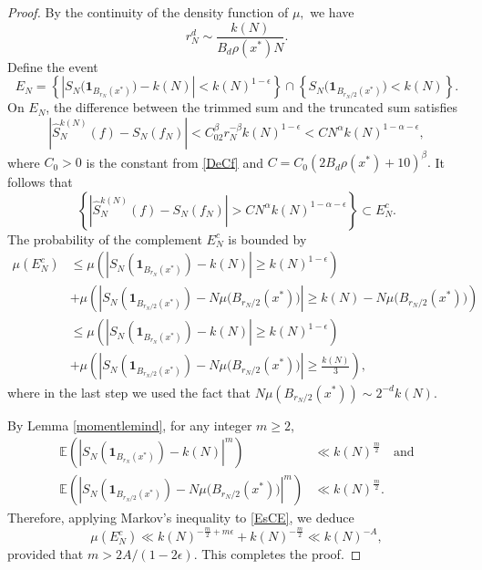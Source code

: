 \documentclass[11pt,twoside,a4paper,reqno]{amsart}
\newcommand{\E}{\mathbb{E}}
\def\one{{\mathbf{1}}}
\begin{document}
\begin{proof}
By the continuity of the density function of $\mu,$ we have
$$r_N^d\sim \frac{k(N)}{B_d \rho(x^*) N}.$$ Define the event
$$
E_N=\left\{\left|S_N\bigl(\one_{B_{r_N}(x^*)}\bigr)-k(N)\right|<k(N)^{1-\epsilon} \right\}\cap\left\{ S_N\bigl(\one_{B_{r_N/2}(x^*)}\bigr)<k(N) \right\}.
$$
On $E_N$, the difference between the trimmed sum and the truncated sum satisfies
$$
\left|\hat{S}_N^{k(N)}(f)-S_N(f_N)\right|<C_02^{\beta} r_N^{-\beta} k(N)^{1-\epsilon}< C N^{\alpha} k(N)^{1-\alpha - \epsilon},
$$
where $C_0 > 0$ is the constant from \eqref{DeCf} and $C=C_0(2 B_d\rho(x^*)+10)^{\beta}.$
It follows that
$$\left\{\left|\hat{S}_N^{k(N)}(f)-S_N(f_N) \right|>C N^{\alpha} k(N)^{1-\alpha - \epsilon}\right\}\subset E_N^c.$$
The probability of the complement $E_N^c$ is bounded by
\begin{equation}\label{EsCE}
\begin{aligned}
\mu(E_N^c)&\leq \mu\left(\left|S_N\left(\one_{B_{r_N}(x^*)}\right) - k(N)\right| \geq k(N)^{1-\epsilon} \right)\\
& + \mu\left( \left|S_N\left(\one_{B_{r_N/2}(x^*)}\right) - N \mu\bigl(B_{r_N/2}(x^*)\bigr) \right| \geq k(N) - N \mu\bigl(B_{r_N/2}(x^*)\bigr) \right)\\
&\leq \mu\left(\left|S_N\left(\one_{B_{r_N}(x^*)}\right)-k(N)\right| \geq k(N)^{1-\epsilon} \right)\\
&+ \mu\left(\left|S_N\left(\one_{B_{r_N/2}(x^*)}\right) - N\mu\bigl(B_{r_N/2}(x^*)\bigr)\right| \geq \tfrac{k(N)}{3} \right),
\end{aligned}
\end{equation}
where in the last step we used the fact that $N \mu(B_{r_N/2}(x^*))\sim 2^{-d} k(N)$.


By Lemma \ref{momentlemind}, for any integer $m \geq 2$,
\begin{align*}
\E\left( \left|S_N\left(\one_{B_{r_N}(x^*)}\right)-k(N)\right|^m \right)& \ll k(N)^{\frac{m}{2}} \quad \text{and} \\
\E \left(\left|S_N\left(\one_{B_{r_N/2}(x^*)}\right)-N\mu\bigl(B_{r_N/2}(x^*)\bigr)\right|^m\right)& \ll k(N)^{\frac{m}{2}}.
\end{align*}
Therefore, applying Markov's inequality to \eqref{EsCE}, we deduce
$$
\mu(E_N^c) \ll k(N)^{-\frac{m}{2}+m\epsilon} + k(N)^{-\frac{m}{2}} \ll k(N)^{-A},
$$
provided that $m>2A/(1-2\epsilon).$ This completes the proof.
\end{proof}
\end{document}
